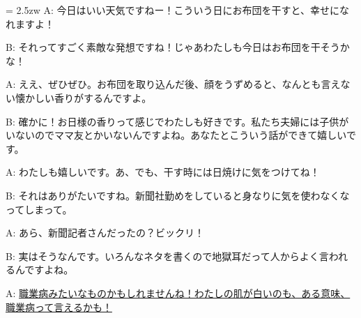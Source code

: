 \documentclass[11pt]{amsart}
\title{}
\author{}
\newenvironment{hangall}[1]{\hangindent = 2.5zw\everypar{\hangindent = 2.5zw}}{}
\begin{document}
\maketitle
\begin{hangall}{}%
A: 今日はいい天気ですねー！こういう日にお布団を干すと、幸せになれますよ！

B: それってすごく素敵な発想ですね！じゃあわたしも今日はお布団を干そうかな！

A: ええ、ぜひぜひ。お布団を取り込んだ後、顔をうずめると、なんとも言えない懐かしい香りがするんですよ。

B: 確かに！お日様の香りって感じでわたしも好きです。私たち夫婦には子供がいないのでママ友とかいないんですよね。あなたとこういう話ができて嬉しいです。

A: わたしも嬉しいです。あ、でも、干す時には日焼けに気をつけてね！

B: それはありがたいですね。新聞社勤めをしていると身なりに気を使わなくなってしまって。

A: あら、新聞記者さんだったの？ビックリ！

B: 実はそうなんです。いろんなネタを書くので地獄耳だって人からよく言われるんですよね。

A: \ul{職業病みたいなものかもしれませんね！わたしの肌が白いのも、ある意味、職業病って言えるかも！}\end{hangall}
\end{document}
